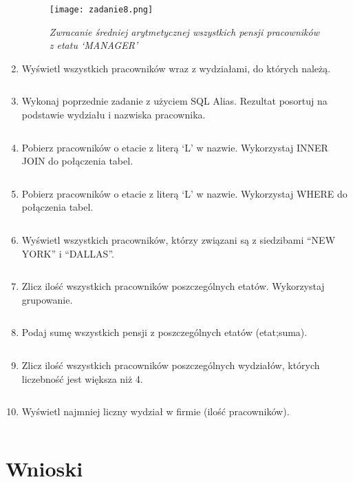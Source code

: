 \documentclass[a4paper, 10pt]{article}
\begin{document}
\begin{enumerate}
\begin{figure}[H]
	\centering
	\texttt{[image: zadanie8.png]}
	\caption{\textit{Zwracanie średniej arytmetycznej wszystkich pensji pracowników z etatu `MANAGER'}}
\end{figure}


\item Wyświetl wszystkich pracowników wraz z wydziałami, do których należą.
\begin{lstlisting}[style=SQL]
\end{lstlisting}


\item Wykonaj poprzednie zadanie z użyciem SQL Alias. Rezultat posortuj na podstawie wydziału i nazwiska pracownika.  
\begin{lstlisting}[style=SQL]
\end{lstlisting}


\item Pobierz pracowników o etacie z literą `L' w nazwie. Wykorzystaj INNER JOIN do połączenia tabel. 
\begin{lstlisting}[style=SQL]
\end{lstlisting}


\item Pobierz pracowników o etacie z literą `L' w nazwie. Wykorzystaj WHERE do połączenia tabel. 
\begin{lstlisting}[style=SQL]
\end{lstlisting}


\item Wyświetl wszystkich pracowników, którzy związani są z siedzibami ``NEW YORK'' i ``DALLAS''. 
\begin{lstlisting}[style=SQL]
\end{lstlisting}


\item Zlicz ilość wszystkich pracowników poszczególnych etatów. Wykorzystaj grupowanie. 
\begin{lstlisting}[style=SQL]
\end{lstlisting}


\item Podaj sumę wszystkich pensji z poszczególnych etatów (etat;suma).
\begin{lstlisting}[style=SQL]
\end{lstlisting}


\item Zlicz ilość wszystkich pracowników poszczególnych wydziałów, których liczebność jest większa niż 4.  
\begin{lstlisting}[style=SQL]
\end{lstlisting}


\item Wyświetl najmniej liczny wydział w firmie (ilość pracowników).
\begin{lstlisting}[style=SQL]
\end{lstlisting}
\end{enumerate}


\section{Wnioski}
\end{document}
